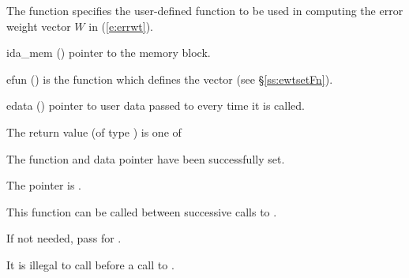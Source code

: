 {
  The function  specifies the user-defined function
  to be used in computing the error weight vector $W$ in (\ref{e:errwt}).
}
{
  \begin{args}
  \item[ida\_mem] ()
    pointer to the {\ida} memory block.
  \item[efun] () 
    is the {\C} function which defines the  vector (see \S\ref{ss:ewtsetFn}).
  \item[edata] ()
    pointer to user data passed to  every time it is called.
  \end{args}
}
{
  The return value  (of type ) is one of
  \begin{args}
  \item[\Id{IDA\_SUCCESS}] 
    The function  and data pointer  have been successfully set.
  \item[\Id{IDA\_MEM\_NULL}]
    The  pointer is .
  \end{args}
}
{
  This function can be called between successive calls to .

  If not needed, pass  for .

  {\warn} It is illegal to call  before a call to .
}
